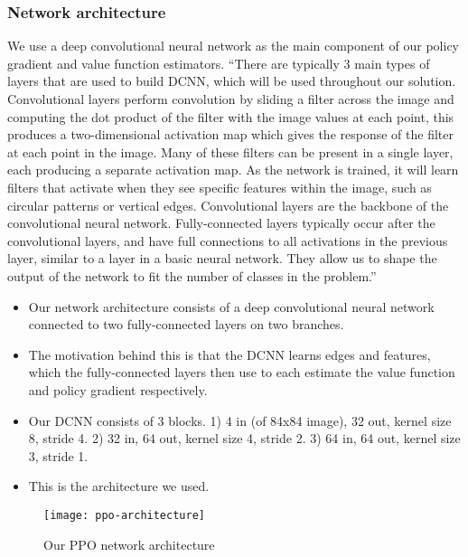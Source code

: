 \documentclass[12pt,a4paper]{article}
\begin{document}
\subsubsection{Network architecture}
We use a deep convolutional neural network as the main component of our policy gradient and value function estimators. ``There are typically 3 main types of layers that are used to build DCNN, which will be
used throughout our solution. Convolutional layers perform convolution by sliding a filter
across the image and computing the dot product of the filter with the image values at each
point, this produces a two-dimensional activation map which gives the response of the filter
at each point in the image. Many of these filters can be present in a single layer, each
producing a separate activation map. As the network is trained, it will learn filters that
activate when they see specific features within the image, such as circular patterns or vertical
edges. Convolutional layers are the backbone of the convolutional neural network. Fully-connected layers typically occur after the
convolutional layers, and have full connections to all activations in the previous
layer, similar to a layer in a basic neural network. They allow us to shape the output of the
network to fit the number of classes in the problem.''

\begin{itemize}
    \item Our network architecture consists of a deep convolutional neural network connected to two fully-connected layers on two branches. 
    \item The motivation behind this is that the DCNN learns edges and features, which the fully-connected layers then use to each estimate the value function and policy gradient respectively.
    \item Our DCNN consists of 3 blocks. 1) 4 in (of 84x84 image), 32 out, kernel size 8, stride 4. 2) 32 in, 64 out, kernel size 4, stride 2. 3) 64 in, 64 out, kernel size 3, stride 1.
    \item This is the architecture we used.
\end{itemize}

\begin{figure}[h]
\centering
\texttt{[image: ppo-architecture]}
\caption{Our PPO network architecture}
\end{figure}
    
\end{document}

